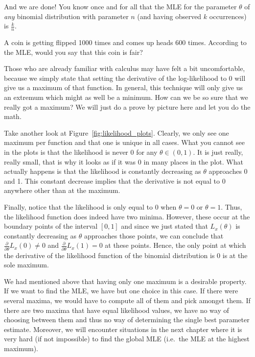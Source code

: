 And we are done! You know once and for all that the MLE for the parameter $\theta$ of \emph{any} binomial distribution with parameter $n$ (and having observed $k$ occurrences) is $ \frac{k}{n} $.

\begin{Exercise}
A coin is getting flipped 1000 times and comes up heads 600 times. According to the MLE, would you say that this coin is fair?
\end{Exercise}

Those who are already familiar with calculus may have felt a bit uncomfortable, because we simply state that setting the derivative of the log-likelihood
to 0 will give us a maximum of that function. In general, this technique will only give us an extremum which might as well be a minimum. How can we be so sure that
we really got a maximum? We will just do a prove by picture here and let you do the math. 

Take another look at Figure~\ref{fig:likelihood_plots}. Clearly, we only
see one maximum per function and that one is unique in all cases. 
What you cannot see in the plots is that the likelihood is never 0 for any $ \theta \in (0,1) $. It is just
really, really small, that is why it looks as if it was 0 in many places in the plot. What actually happens is that the likelihood is constantly decreasing as
$ \theta $ approaches 0 and 1. This constant decrease implies that the derivative is not equal to $ 0 $ anywhere other than at the maximum.

Finally, notice that the likelihood is only equal to 0 when $ \theta = 0 $ or $ \theta = 1 $. Thus, the likelihood function does indeed have two minima. However, these 
occur at the boundary points of the interval $ [0,1] $ and since we just stated that $ L_{x}(\theta) $ is constantly decreasing as $ \theta $ approaches those points,
we can conclude that $ \frac{\partial}{\partial\theta}L_{x}(0) \not = 0 $ and $ \frac{\partial}{\partial\theta}L_{x}(1) = 0 $ at these points. Hence, the only point at which the
derivative of the likelihood function of the binomial distribution is $ 0 $ is at the sole maximum.

We had mentioned above that having only one maximum is a desirable property. If we want to find the MLE, we have but one choice in this case. If there were
several maxima, we would have to compute all of them and pick amongst them. If there are two maxima that have equal likelihood values, we have no way of choosing
between them and thus no way of determining the single best parameter estimate. Moreover, we will encounter situations in the next chapter where it is very hard (if not
impossible) to find the global MLE (i.e.\ the MLE at the highest maximum).

